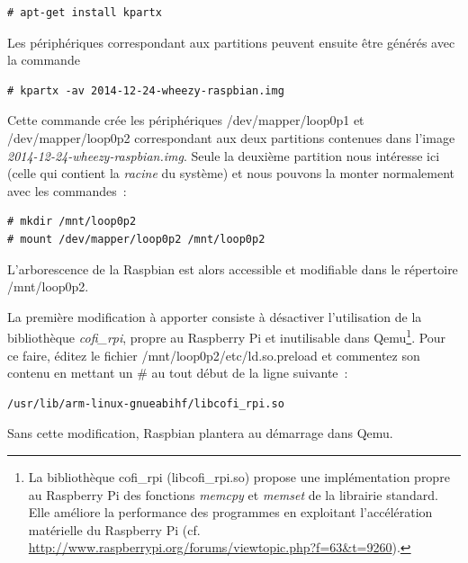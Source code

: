\documentclass{article}
\begin{document}
\begin{verbatim}
# apt-get install kpartx
\end{verbatim}



Les périphériques correspondant aux partitions peuvent ensuite être générés avec la commande

\begin{verbatim}
# kpartx -av 2014-12-24-wheezy-raspbian.img
\end{verbatim}

Cette commande crée les périphériques /dev/mapper/loop0p1 et /dev/mapper/loop0p2
correspondant aux deux partitions contenues dans l'image {\em
2014-12-24-wheezy-raspbian.img}.
Seule la deuxième partition nous intéresse ici (celle qui contient la {\em racine}
du système) et nous pouvons la monter normalement avec les commandes~:
\begin{verbatim}
# mkdir /mnt/loop0p2
# mount /dev/mapper/loop0p2 /mnt/loop0p2
\end{verbatim}

L'arborescence de la Raspbian est alors accessible et modifiable dans le
répertoire \og{}/mnt/loop0p2\fg{}.

La première modification à apporter consiste à désactiver l'utilisation
de la bibliothèque {\em cofi\_rpi}, propre au Raspberry Pi et inutilisable dans
Qemu\footnote{La bibliothèque cofi\_rpi (libcofi\_rpi.so) propose une
    implémentation propre au Raspberry Pi des fonctions {\em memcpy} et {\em
    memset} de la librairie standard. Elle améliore la performance des
    programmes en exploitant l'accélération matérielle du Raspberry Pi (cf.
    \url{http://www.raspberrypi.org/forums/viewtopic.php?f=63&t=9260}).
}.
Pour ce faire, éditez le fichier \og{}/mnt/loop0p2/etc/ld.so.preload\fg{} et
commentez son contenu en mettant un \# au tout début de la ligne suivante~:
\begin{verbatim}
/usr/lib/arm-linux-gnueabihf/libcofi_rpi.so
\end{verbatim}
Sans cette modification, Raspbian plantera au démarrage dans Qemu.
\end{document}
